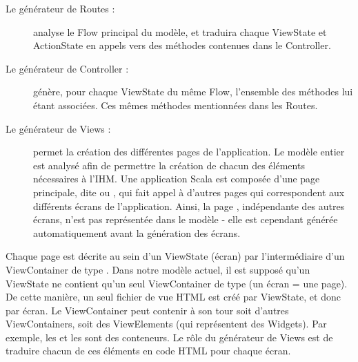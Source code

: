 \begin{description}

\item[Le générateur de Routes :] analyse le Flow principal du modèle, et traduira chaque ViewState et ActionState en appels vers des méthodes contenues dans le Controller.

\item[Le générateur de Controller :] génère, pour chaque ViewState du même Flow, l'ensemble des méthodes lui étant associées. Ces mêmes méthodes mentionnées dans les Routes.

\item[Le générateur de Views :] permet la création des différentes pages de l'application. Le modèle entier est analysé afin de permettre la création de chacun des éléments nécessaires à l'\textsc{IHM}. Une application Scala est composée d'une page principale, dite  ou , qui fait appel à d'autres pages qui correspondent aux différents écrans de l'application. Ainsi, la page , indépendante des autres écrans, n'est pas représentée dans le modèle - elle est cependant générée automatiquement avant la génération des écrans.

\end{description}
Chaque page est décrite au sein d'un ViewState (écran) par l'intermédiaire d'un ViewContainer de type . Dans notre modèle actuel, il est supposé qu'un ViewState ne contient qu'un seul ViewContainer de type  (un écran = une page). De cette manière, un seul fichier de vue HTML est créé par ViewState, et donc par écran. Le ViewContainer  peut contenir à son tour soit d'autres ViewContainers, soit des ViewElements (qui représentent des Widgets). Par exemple, les  et les  sont des conteneurs. Le rôle du générateur de Views est de traduire chacun de ces éléments en code HTML pour chaque écran.


